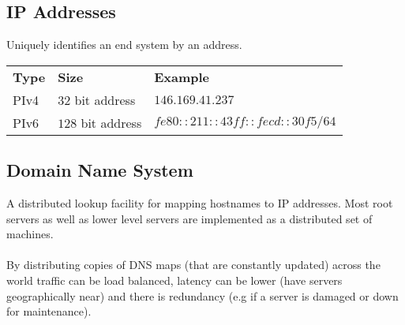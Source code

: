 \documentclass{report}
\begin{document}
        \subsection*{IP Addresses}
            Uniquely identifies an end system by an address.
            \begin{center}
                \begin{tabular}{l l l}
                    \textbf{Type} & \textbf{Size} & \textbf{Example} \\
                    PIv4 & $32$ bit address & $146.169.41.237$ \\
                    PIv6 & $128$ bit address & $fe80::211::43ff::fecd::30f5/64$ \\
                \end{tabular}
            \end{center}
        \subsection*{Domain Name System}
            A distributed lookup facility for mapping hostnames to IP addresses.
            Most root servers as well as lower level servers are implemented as a distributed set of machines. 
            \\
            \\ By distributing copies of DNS maps (that are constantly updated) across the world traffic can be load balanced, latency can be lower (have servers geographically near) and there is redundancy (e.g if a server is damaged or down for maintenance).
\end{document}
